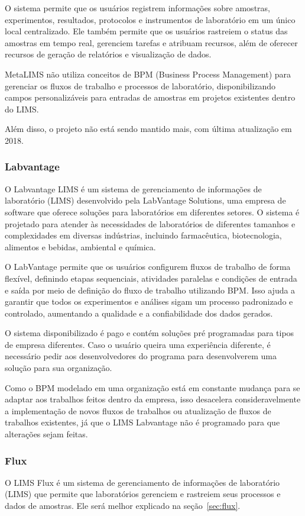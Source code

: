 O sistema permite que os usuários registrem informações sobre amostras, experimentos, resultados, protocolos e instrumentos de laboratório em um único local centralizado. Ele também permite que os usuários rastreiem o status das amostras em tempo real, gerenciem tarefas e atribuam recursos, além de oferecer recursos de geração de relatórios e visualização de dados.

MetaLIMS não utiliza conceitos de BPM (Business Process Management) para gerenciar os fluxos de trabalho e processos de laboratório, disponibilizando campos personalizáveis para entradas de amostras em projetos existentes dentro do LIMS.

Além disso, o projeto não está sendo mantido mais, com última atualização em 2018.

\subsubsection{Labvantage}

O Labvantage LIMS é um sistema de gerenciamento de informações de laboratório (LIMS) desenvolvido pela LabVantage Solutions, uma empresa de software que oferece soluções para laboratórios em diferentes setores. O sistema é projetado para atender às necessidades de laboratórios de diferentes tamanhos e complexidades em diversas indústrias, incluindo farmacêutica, biotecnologia, alimentos e bebidas, ambiental e química.

O LabVantage permite que os usuários configurem fluxos de trabalho de forma flexível, definindo etapas sequenciais, atividades paralelas e condições de entrada e saída por meio de definição do fluxo de trabalho utilizando BPM. Isso ajuda a garantir que todos os experimentos e análises sigam um processo padronizado e controlado, aumentando a qualidade e a confiabilidade dos dados gerados.

O sistema disponibilizado é pago e contém soluções pré programadas para tipos de empresa diferentes. Caso o usuário queira uma experiência diferente, é necessário pedir aos desenvolvedores do programa para desenvolverem uma solução para sua organização.

Como o BPM modelado em uma organização está em constante mudança para se adaptar aos trabalhos feitos dentro da empresa, isso desacelera consideravelmente a implementação de novos fluxos de trabalhos ou atualização de fluxos de trabalhos existentes, já que o LIMS Labvantage não é programado para que alterações sejam feitas.

\subsubsection{Flux}

O LIMS Flux é um sistema de gerenciamento de informações de laboratório (LIMS) que permite que laboratórios gerenciem e rastreiem seus processos e dados de amostras. Ele será melhor explicado na seção~\ref{sec:flux}.



